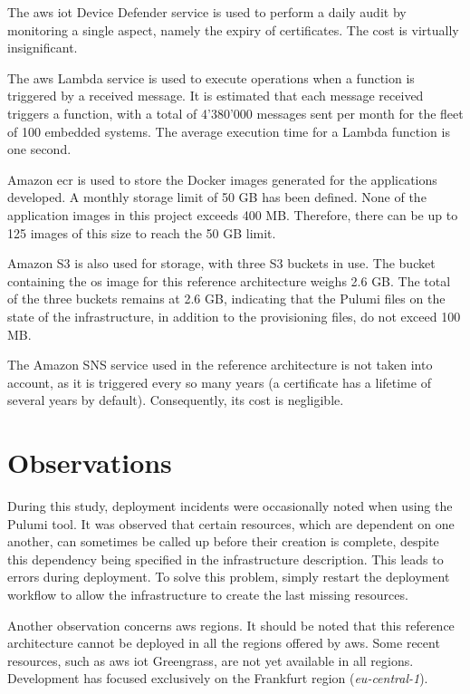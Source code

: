 The \gls{aws} \acrshort{iot} Device Defender service is used to perform a daily audit by monitoring a single aspect, namely the expiry of certificates. The cost is virtually insignificant.

The \gls{aws} Lambda service is used to execute operations when a function is triggered by a received message. It is estimated that each message received triggers a function, with a total of 4'380'000 messages sent per month for the fleet of 100 embedded systems. The average execution time for a Lambda function is one second.

Amazon \acrfull{ecr} is used to store the Docker images generated for the applications developed. A monthly storage limit of 50 GB has been defined. None of the application images in this project exceeds 400 MB. Therefore, there can be up to 125 images of this size to reach the 50 GB limit.

Amazon S3 is also used for storage, with three S3 buckets in use. The bucket containing the \acrshort{os} image for this reference architecture weighs 2.6 GB. The total of the three buckets remains at 2.6 GB, indicating that the Pulumi files on the state of the infrastructure, in addition to the provisioning files, do not exceed 100 MB.

The Amazon SNS service used in the reference architecture is not taken into account, as it is triggered every so many years (a certificate has a lifetime of several years by default). Consequently, its cost is negligible.

\section{Observations}

During this study, deployment incidents were occasionally noted when using the Pulumi tool. It was observed that certain resources, which are dependent on one another, can sometimes be called up before their creation is complete, despite this dependency being specified in the infrastructure description. This leads to errors during deployment. To solve this problem, simply restart the deployment workflow to allow the infrastructure to create the last missing resources.

Another observation concerns \gls{aws} regions. It should be noted that this reference architecture cannot be deployed in all the regions offered by \gls{aws}. Some recent resources, such as \gls{aws} \acrshort{iot} Greengrass, are not yet available in all regions. Development has focused exclusively on the Frankfurt region (\textit{eu-central-1}).
